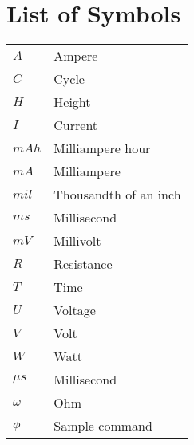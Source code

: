 \chapter*{List of Symbols}
\begin{tabular}{ll}
 
    $A$
        & Ampere\\
    $C$
        & Cycle\\
    $H$
         & Height\\
    $I$
         & Current\\
    $mAh$
        & Milliampere hour\\
    $mA$
        & Milliampere\\
    $mil$
        & Thousandth of an inch\\  
    $ms$
        & Millisecond\\
    $mV$
        & Millivolt\\
    $R$
        & Resistance\\

    $T$ & Time \\

    $U$
        & Voltage\\ 
    $V$
        & Volt\\
    $W$
        & Watt\\
    $\mu s$
        & Millisecond\\
    $\omega$
        & Ohm\\
    $\phi$ 
        &Sample command\\
\end{tabular}
